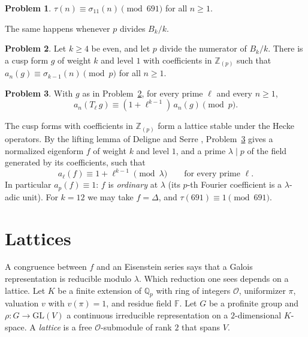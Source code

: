 \documentclass[reqno]{amsart}
\theoremstyle{definition}
\newtheorem{problem}{Problem}[section]
\theoremstyle{plain}
\newcommand{\Z}{\mathbb{Z}}
\newcommand{\F}{\mathbb{F}}
\newcommand{\Oc}{\mathcal{O}}
\begin{document}
\begin{problem}\label{pr:691}
\(\tau(n) \equiv \sigma_{11}(n) \pmod{691}\) for all \(n \ge 1\).
\end{problem}

The same happens whenever \(p\) divides \(B_k/k\).

\begin{problem}\label{pr:cuspform}
Let \(k \ge 4\) be even, and let \(p\) divide the numerator of \(B_k/k\).  There is a cusp form \(g\) of weight \(k\) and level \(1\) with coefficients in \(\Z_{(p)}\) such that \(a_n(g) \equiv \sigma_{k-1}(n) \pmod p\) for all \(n \ge 1\).
\end{problem}

\begin{problem}\label{pr:eigen-modp}
With \(g\) as in Problem~\ref{pr:cuspform}, for every prime \(\ell\) and every \(n \ge 1\),
\[
  a_n(T_\ell\, g) \equiv (1 + \ell^{k-1})\, a_n(g) \pmod p .
\]
\end{problem}

The cusp forms with coefficients in \(\Z_{(p)}\) form a lattice stable under the Hecke operators.  By the lifting lemma of Deligne and Serre \cite[Lemme~6.11]{DeS}, Problem~\ref{pr:eigen-modp} gives a normalized eigenform \(f\) of weight \(k\) and level \(1\), and a prime \(\lambda \mid p\) of the field generated by its coefficients, such that
\begin{equation}\label{eq:congruence}
  a_\ell(f) \equiv 1 + \ell^{k-1} \pmod \lambda \qquad \text{for every prime } \ell .
\end{equation}
In particular \(a_p(f) \equiv 1\): \(f\) is \emph{ordinary} at \(\lambda\) (its \(p\)-th Fourier coefficient is a \(\lambda\)-adic unit).  For \(k = 12\) we may take \(f = \Delta\), and \(\tau(691) \equiv 1 \pmod{691}\).

\section{Lattices}\label{sec:lattices}

A congruence between \(f\) and an Eisenstein series says that a Galois representation is reducible modulo \(\lambda\).  Which reduction one sees depends on a lattice.  Let \(K\) be a finite extension of \(\mathbb{Q}_p\) with ring of integers \(\Oc\), uniformizer \(\pi\), valuation \(v\) with \(v(\pi) = 1\), and residue field \(\F\).  Let \(G\) be a profinite group and \(\rho \colon G \to \mathrm{GL}(V)\) a continuous irreducible representation on a \(2\)-dimensional \(K\)-space.  A \emph{lattice} is a free \(\Oc\)-submodule of rank \(2\) that spans \(V\).
\end{document}
